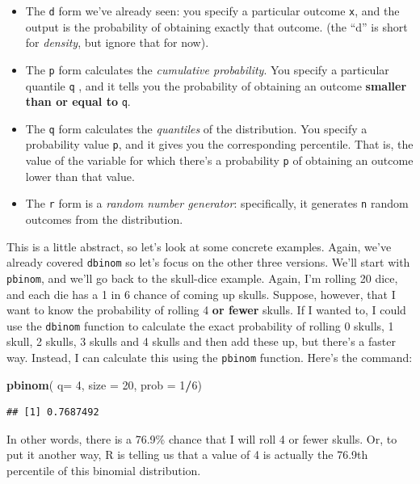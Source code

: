 \documentclass[
]{book}
\newenvironment{Shaded}{\begin{snugshade}}{\end{snugshade}}
\newcommand{\AttributeTok}[1]{\textcolor[rgb]{0.13,0.29,0.53}{#1}}
\newcommand{\DecValTok}[1]{\textcolor[rgb]{0.00,0.00,0.81}{#1}}
\newcommand{\FunctionTok}[1]{\textcolor[rgb]{0.13,0.29,0.53}{\textbf{#1}}}
\newcommand{\NormalTok}[1]{#1}
\newcommand{\SpecialCharTok}[1]{\textcolor[rgb]{0.81,0.36,0.00}{\textbf{#1}}}
\begin{document}
\begin{itemize}
\item
  The \texttt{d} form we've already seen: you specify a particular outcome \texttt{x}, and the output is the probability of obtaining exactly that outcome. (the ``d'' is short for \emph{density}, but ignore that for now).
\item
  The \texttt{p} form calculates the \emph{cumulative probability}. You specify a particular quantile \texttt{q} , and it tells you the probability of obtaining an outcome \textbf{smaller than or equal to} \texttt{q}.
\item
  The \texttt{q} form calculates the \emph{quantiles} of the distribution. You specify a probability value \texttt{p}, and it gives you the corresponding percentile. That is, the value of the variable for which there's a probability \texttt{p} of obtaining an outcome lower than that value.
\item
  The \texttt{r} form is a \emph{random number generator}: specifically, it generates \texttt{n} random outcomes from the distribution.
\end{itemize}

This is a little abstract, so let's look at some concrete examples. Again, we've already covered \texttt{dbinom} so let's focus on the other three versions. We'll start with \texttt{pbinom}, and we'll go back to the skull-dice example. Again, I'm rolling 20 dice, and each die has a 1 in 6 chance of coming up skulls. Suppose, however, that I want to know the probability of rolling 4 \textbf{or fewer} skulls. If I wanted to, I could use the \texttt{dbinom} function to calculate the exact probability of rolling 0 skulls, 1 skull, 2 skulls, 3 skulls and 4 skulls and then add these up, but there's a faster way. Instead, I can calculate this using the \texttt{pbinom} function. Here's the command:

\begin{Shaded}
\begin{Highlighting}[]
\FunctionTok{pbinom}\NormalTok{( }\AttributeTok{q=} \DecValTok{4}\NormalTok{, }\AttributeTok{size =} \DecValTok{20}\NormalTok{, }\AttributeTok{prob =} \DecValTok{1}\SpecialCharTok{/}\DecValTok{6}\NormalTok{)}
\end{Highlighting}
\end{Shaded}

\begin{verbatim}
## [1] 0.7687492
\end{verbatim}

In other words, there is a 76.9\% chance that I will roll 4 or fewer skulls. Or, to put it another way, R is telling us that a value of 4 is actually the 76.9th percentile of this binomial distribution.
\end{document}
